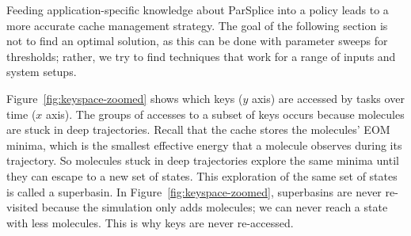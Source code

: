 %
%
%
%
%
%

Feeding application-specific knowledge about ParSplice into a policy
leads to a more accurate cache management strategy.  The goal of the following
section is not to find an optimal solution, as this can be done with parameter
sweeps for thresholds; rather, we try to find techniques that work for a range
of inputs and system setups.

Figure~\ref{fig:keyspace-zoomed} shows which keys (\(y\) axis) are accessed by
tasks over time (\(x\) axis). The groups of accesses to a subset of keys occurs
because molecules are stuck in deep trajectories. Recall that the cache stores
the molecules' EOM minima, which is the smallest effective energy that a
molecule observes during its trajectory. So molecules stuck in deep
trajectories explore the same minima until they can escape to a new set of
states. This exploration of the same set of states is called a superbasin.  In
Figure~\ref{fig:keyspace-zoomed}, superbasins are never re-visited because the
simulation only adds molecules; we can never reach a state with less molecules.
This is why keys are never re-accessed.  

